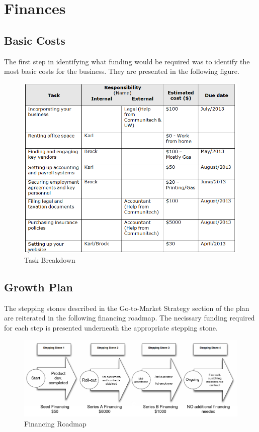 \section{Finances}

\subsection{Basic Costs}
The first step in identifying what funding would be required was to identify the most basic costs for the business. They are presented in the following figure.

\begin{figure}[ht!]
\centering
\includegraphics[width=150mm]{images/TaskList.png}
\caption{Task Breakdown}
\label{tasks}
\end{figure}

\subsection{Growth Plan}
The stepping stones described in the Go-to-Market Strategy section of the plan are reiterated in the following financing roadmap. The necissary funding required for each step is presented underneath the appropriate stepping stone.

\begin{figure}[ht!]
\centering
\includegraphics[width=150mm]{images/MSCI454-FinancingRoadmap.png}
\caption{Financing Roadmap}
\label{steppingStones}
\end{figure}
 
